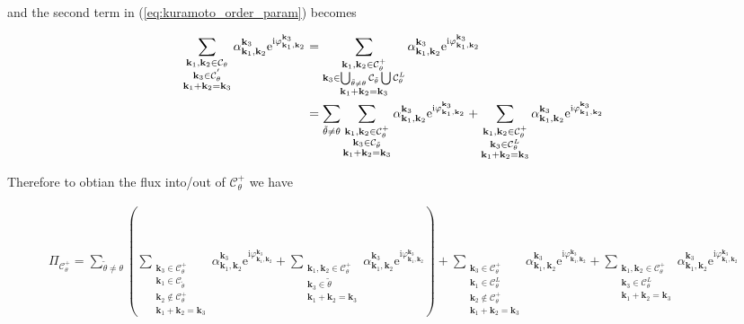 \documentclass[9pt]{article}
\newcommand{\triad}[3]{\varphi_{#1, #2}^{#3}}                     %
\newcommand{\ii}{\mathrm{i}}      								  %
\newcommand{\e}{\mathrm{e}}      								  %
\newcommand{\alphakkk}[3]{\alpha_{\bfkn{#1}, \bfkn{#2}}^{\bfkn{#3}}}
\newcommand{\bfkn}[1]{\mathbf{k}_{#1}}								%
\begin{document}
and the second term in (\ref{eq:kuramoto_order_param}) becomes

\begin{align}
	\sum_{\substack{\bfkn{1}, \bfkn{2} \in \mathcal{C}_{\theta} \\ \bfkn{3} \in \mathcal{C}_{\theta}^{'} \\ \bfkn{1} + \bfkn{2} = \bfkn{3}}} \alphakkk{{1}}{2}{3}\e^{\ii \triad{\bfkn{1}}{\bfkn{2}}{\bfkn{3}}} &= \sum_{\substack{\bfkn{1}, \bfkn{2} \in \mathcal{C}_{\theta}^{+} \\ \bfkn{3} \in \bigcup_{\tilde{\theta} \neq \theta} \mathcal{C}_{\tilde{\theta}} \bigcup \mathcal{C}_{\theta}^{L} \\ \bfkn{1} + \bfkn{2} = \bfkn{3}}} \alphakkk{{1}}{2}{3}\e^{\ii \triad{\bfkn{1}}{\bfkn{2}}{\bfkn{3}}} \notag \\
	&= \sum_{\tilde{\theta} \neq \theta} \sum_{\substack{\bfkn{1}, \bfkn{2} \in \mathcal{C}_{\theta}^{+} \\ \bfkn{3} \in \mathcal{C}_{\tilde{\theta}} \\ \bfkn{1} + \bfkn{2} = \bfkn{3}}} \alphakkk{{1}}{2}{3}\e^{\ii \triad{\bfkn{1}}{\bfkn{2}}{\bfkn{3}}} + \sum_{\substack{\bfkn{1}, \bfkn{2} \in \mathcal{C}_{\theta}^{+} \\ \bfkn{3} \in \mathcal{C}_{\theta}^{L} \\ \bfkn{1} + \bfkn{2} = \bfkn{3}}} \alphakkk{{1}}{2}{3}\e^{\ii \triad{\bfkn{1}}{\bfkn{2}}{\bfkn{3}}}
\end{align}

Therefore to obtian the flux into/out of $\mathcal{C}_{\theta}^{+}$ we have

\begin{align}
	\Pi_{\mathcal{C}_{\theta}^{+}} = \sum_{\tilde{\theta} \neq \theta} \left( \sum_{\substack{\bfkn{3} \in \mathcal{C}_{\theta}^{+} \\ \bfkn{1} \in \mathcal{C}_{\tilde{\theta}} \\ \bfkn{2} \notin \mathcal{C}_{\theta}^{+} \\ \bfkn{1} + \bfkn{2} = \bfkn{3}}} \alphakkk{{1}}{2}{3}\e^{\ii \triad{\bfkn{1}}{\bfkn{2}}{\bfkn{3}}} + \sum_{\substack{\bfkn{1}, \bfkn{2} \in \mathcal{C}_{\theta}^{+} \\ \bfkn{3} \in \mathcal{\tilde{\theta}} \\ \bfkn{1} + \bfkn{2} = \bfkn{3}}} \alphakkk{{1}}{2}{3}\e^{\ii \triad{\bfkn{1}}{\bfkn{2}}{\bfkn{3}}} \right) +  \sum_{\substack{\bfkn{3} \in \mathcal{C}_{\theta}^{+} \\ \bfkn{1} \in \mathcal{C}_{\theta}^{L} \\ \bfkn{2} \notin \mathcal{C}_{\theta}^{+} \\ \bfkn{1} + \bfkn{2} = \bfkn{3}}} \alphakkk{{1}}{2}{3}\e^{\ii \triad{\bfkn{1}}{\bfkn{2}}{\bfkn{3}}} + \sum_{\substack{\bfkn{1}, \bfkn{2} \in \mathcal{C}_{\theta}^{+} \\ \bfkn{3} \in \mathcal{C}_{\theta}^{L} \\ \bfkn{1} + \bfkn{2} = \bfkn{3}}} \alphakkk{{1}}{2}{3}\e^{\ii \triad{\bfkn{1}}{\bfkn{2}}{\bfkn{3}}}
\end{align}
\end{document}
